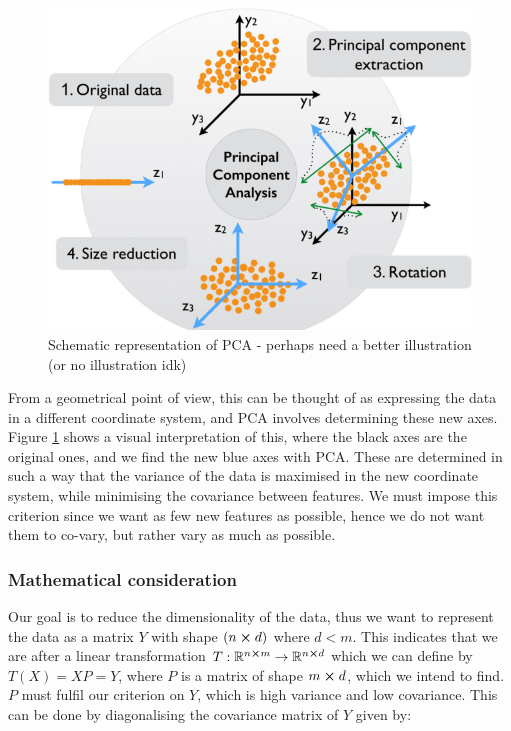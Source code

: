         \begin{figure}
            \includegraphics[width=\linewidth]{figs/pca_schematic.png}
            \caption{Schematic representation of PCA - perhaps need a better illustration (or no illustration idk)\citep{pca_img}}
            \label{theo:fig:pca_schematic}
        \end{figure}
        
        From a geometrical point of view, this can be thought of as expressing the data in a different coordinate system, and PCA involves determining these new axes. Figure \ref{theo:fig:pca_schematic}  shows a visual interpretation of this, where the black axes are the original ones, and we find the new blue axes with PCA. These are determined in such a way that the variance of the data is maximised in the new coordinate system, while minimising the covariance between features. We must impose this criterion since we want as few new features as possible, hence we do not want them to co-vary, but rather vary as much as possible. 

    \subsubsection{Mathematical consideration}

    Our goal is to reduce the dimensionality of the data, thus we want to represent the data as a matrix $Y$ with shape $(n\cross d)$ where $d<m$. This indicates that we are after a linear transformation $T:\mathbb{R}^{n\cross m} \to \mathbb{R}^{n\cross d}$ which we can define by $T(X) = XP = Y$, where $P$ is a matrix of shape $m\cross d$, which we intend to find. $P$ must fulfil our criterion on $Y$, which is high variance and low covariance. This can be done by diagonalising the covariance matrix of $Y$ given by:

